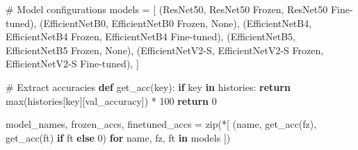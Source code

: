 \documentclass[
  letterpaper,
  DIV=11,
  numbers=noendperiod]{scrartcl}
\newenvironment{Shaded}{\begin{snugshade}}{\end{snugshade}}
\newcommand{\BuiltInTok}[1]{\textcolor[rgb]{0.00,0.23,0.31}{#1}}
\newcommand{\CommentTok}[1]{\textcolor[rgb]{0.37,0.37,0.37}{#1}}
\newcommand{\ControlFlowTok}[1]{\textcolor[rgb]{0.00,0.23,0.31}{\textbf{#1}}}
\newcommand{\DecValTok}[1]{\textcolor[rgb]{0.68,0.00,0.00}{#1}}
\newcommand{\KeywordTok}[1]{\textcolor[rgb]{0.00,0.23,0.31}{\textbf{#1}}}
\newcommand{\NormalTok}[1]{\textcolor[rgb]{0.00,0.23,0.31}{#1}}
\newcommand{\OperatorTok}[1]{\textcolor[rgb]{0.37,0.37,0.37}{#1}}
\newcommand{\StringTok}[1]{\textcolor[rgb]{0.13,0.47,0.30}{#1}}
\newcommand{\VariableTok}[1]{\textcolor[rgb]{0.07,0.07,0.07}{#1}}
\renewenvironment{Shaded}{%
  \begin{tcolorbox}[%
    enhanced,%
    colback=codebg,%
    colframe=codebg,%
    borderline west={3pt}{0pt}{sectionblue},%
    boxrule=0pt,%
    arc=0pt,%
    boxsep=5pt,%
    left=2mm,%
    right=2mm,%
    top=2mm,%
    bottom=2mm%
  ]%
}{%
  \end{tcolorbox}%
}
\begin{document}
\begin{Shaded}
\begin{Highlighting}[]
\CommentTok{\# Model configurations}
\NormalTok{models }\OperatorTok{=}\NormalTok{ [}
\NormalTok{    (}\StringTok{\textquotesingle{}ResNet50\textquotesingle{}}\NormalTok{, }\StringTok{\textquotesingle{}ResNet50 Frozen\textquotesingle{}}\NormalTok{, }\StringTok{\textquotesingle{}ResNet50 Fine{-}tuned\textquotesingle{}}\NormalTok{),}
\NormalTok{    (}\StringTok{\textquotesingle{}EfficientNetB0\textquotesingle{}}\NormalTok{, }\StringTok{\textquotesingle{}EfficientNetB0 Frozen\textquotesingle{}}\NormalTok{, }\VariableTok{None}\NormalTok{),}
\NormalTok{    (}\StringTok{\textquotesingle{}EfficientNetB4\textquotesingle{}}\NormalTok{, }\StringTok{\textquotesingle{}EfficientNetB4 Frozen\textquotesingle{}}\NormalTok{, }
     \StringTok{\textquotesingle{}EfficientNetB4 Fine{-}tuned\textquotesingle{}}\NormalTok{),}
\NormalTok{    (}\StringTok{\textquotesingle{}EfficientNetB5\textquotesingle{}}\NormalTok{, }\StringTok{\textquotesingle{}EfficientNetB5 Frozen\textquotesingle{}}\NormalTok{, }\VariableTok{None}\NormalTok{),}
\NormalTok{    (}\StringTok{\textquotesingle{}EfficientNetV2{-}S\textquotesingle{}}\NormalTok{, }\StringTok{\textquotesingle{}EfficientNetV2{-}S Frozen\textquotesingle{}}\NormalTok{, }
     \StringTok{\textquotesingle{}EfficientNetV2{-}S Fine{-}tuned\textquotesingle{}}\NormalTok{),}
\NormalTok{]}

\CommentTok{\# Extract accuracies}
\KeywordTok{def}\NormalTok{ get\_acc(key):}
    \ControlFlowTok{if}\NormalTok{ key }\KeywordTok{in}\NormalTok{ histories:}
        \ControlFlowTok{return} \BuiltInTok{max}\NormalTok{(histories[key][}\StringTok{\textquotesingle{}val\_accuracy\textquotesingle{}}\NormalTok{]) }\OperatorTok{*} \DecValTok{100}
    \ControlFlowTok{return} \DecValTok{0}

\NormalTok{model\_names, frozen\_accs, finetuned\_accs }\OperatorTok{=} \BuiltInTok{zip}\NormalTok{(}\OperatorTok{*}\NormalTok{[}
\NormalTok{    (name, get\_acc(fz), get\_acc(ft) }\ControlFlowTok{if}\NormalTok{ ft }\ControlFlowTok{else} \DecValTok{0}\NormalTok{)}
    \ControlFlowTok{for}\NormalTok{ name, fz, ft }\KeywordTok{in}\NormalTok{ models}
\NormalTok{])}
\end{Highlighting}
\end{Shaded}
\end{document}
